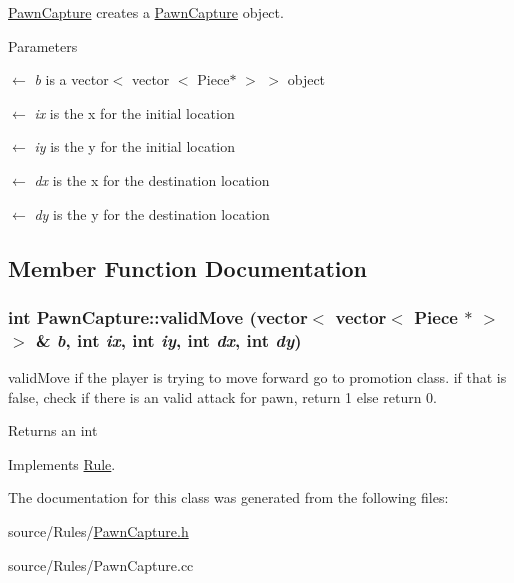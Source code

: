 \hyperlink{classPawnCapture}{PawnCapture} creates a \hyperlink{classPawnCapture}{PawnCapture} object. 
\begin{DoxyParams}{Parameters}
\item[\mbox{$\leftarrow$} {\em b}]is a vector$<$ vector $<$ Piece$\ast$ $>$ $>$ object \item[\mbox{$\leftarrow$} {\em ix}]is the x for the initial location \item[\mbox{$\leftarrow$} {\em iy}]is the y for the initial location \item[\mbox{$\leftarrow$} {\em dx}]is the x for the destination location \item[\mbox{$\leftarrow$} {\em dy}]is the y for the destination location \end{DoxyParams}


\subsection{Member Function Documentation}
\hypertarget{classPawnCapture_afa1faa171cb70974f46add5989c3f373}{
\subsubsection[{validMove}]{\setlength{\rightskip}{0pt plus 5cm}int PawnCapture::validMove (vector$<$ vector$<$ {\bf Piece} $\ast$ $>$ $>$ \& {\em b}, \/  int {\em ix}, \/  int {\em iy}, \/  int {\em dx}, \/  int {\em dy})}}
\label{classPawnCapture_afa1faa171cb70974f46add5989c3f373}


validMove if the player is trying to move forward go to promotion class. if that is false, check if there is an valid attack for pawn, return 1 else return 0. \begin{DoxyReturn}{Returns}
an int 
\end{DoxyReturn}


Implements \hyperlink{classRule}{Rule}.

The documentation for this class was generated from the following files:\begin{DoxyCompactItemize}
\item 
source/Rules/\hyperlink{PawnCapture_8h}{PawnCapture.h}\item 
source/Rules/PawnCapture.cc\end{DoxyCompactItemize}
